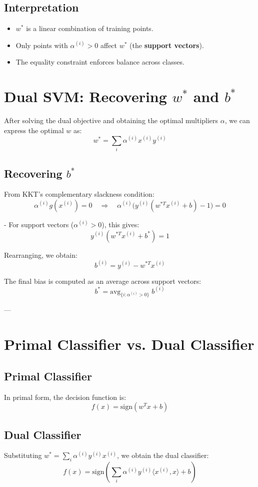 \documentclass[11pt]{article}
\begin{document}
\subsection*{Interpretation}
\begin{itemize}
    \item $w^*$ is a linear combination of training points.
    \item Only points with $\alpha^{(i)} > 0$ affect $w^*$ (the \textbf{support vectors}).
    \item The equality constraint enforces balance across classes.
\end{itemize}

\section*{Dual SVM: Recovering $w^*$ and $b^*$}

After solving the dual objective and obtaining the optimal multipliers $\alpha$, we can express the optimal $w$ as:
\[
w^* = \sum_i \alpha^{(i)} x^{(i)} y^{(i)}
\]

\subsection*{Recovering $b^*$}
From KKT’s complementary slackness condition:
\[
\alpha^{(i)} g(x^{(i)}) = 0
\quad \Rightarrow \quad
\alpha^{(i)} \Big( y^{(i)} (w^{*T} x^{(i)} + b) - 1 \Big) = 0
\]

- For support vectors ($\alpha^{(i)} > 0$), this gives:
\[
y^{(i)} (w^{*T} x^{(i)} + b^*) = 1
\]

Rearranging, we obtain:
\[
b^{(i)} = y^{(i)} - w^{*T} x^{(i)}
\]

The final bias is computed as an average across support vectors:
\[
b^* = \text{avg}_{\{i : \alpha^{(i)} > 0\}} \; b^{(i)}
\]

---

\section*{Primal Classifier vs. Dual Classifier}

\subsection*{Primal Classifier}
In primal form, the decision function is:
\[
f(x) = \text{sign}(w^T x + b)
\]

\subsection*{Dual Classifier}
Substituting $w^* = \sum_i \alpha^{(i)} y^{(i)} x^{(i)}$, we obtain the dual classifier:
\[
f(x) = \text{sign}\!\left( \sum_i \alpha^{(i)} y^{(i)} \langle x^{(i)}, x \rangle + b \right)
\]
\end{document}
